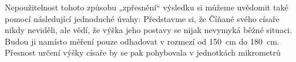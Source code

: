 \begin{mdframed}[style=mdexam]
\begin{example}
      Nepoužitelnost tohoto způsobu „zpřesnění“ výsledku si můžeme uvědomit také pomocí následující
      jednoduché úvahy: Představme si, že Číňané svého císaře nikdy neviděli, ale vědí, že výška
      jeho postavy se nijak nevymyká běžné situaci. Budou ji namísto měření pouze odhadovat v
      rozmezí od \SI{150}{\cm} do \SI{180}{\cm}. Přesnost určení výšky císaře by se pak pohybovala v
      jednotkách mikrometrů
  \end{example}
\end{mdframed}